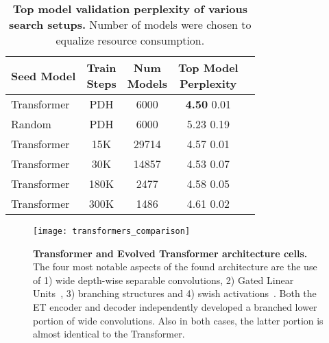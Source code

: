 \documentclass{article}
\begin{document}
\vskip -0.1in
\begin{table}[!h]
\begin{center}
\begin{small}
\begin{sc}
\begin{tabular}{lcccc}
\toprule
Seed Model & \thead{Train \\ Steps} & \thead{Num \\ Models} & \thead{Top Model \\ Perplexity} \\
\midrule
Transformer    & PDH & 6000 & \textbf{4.50}  0.01 \\
Random         & PDH & 6000 & 5.23  0.19 \\
Transformer    & 15K& 29714 & 4.57  0.01 \\
Transformer    & 30K& 14857 & 4.53  0.07 \\
Transformer    & 180K& 2477 & 4.58  0.05 \\
Transformer    & 300K& 1486 & 4.61  0.02 \\
\bottomrule
\end{tabular}
\end{sc}
\end{small}
\end{center}
\vskip -0.1in
\caption{\textbf{Top model validation perplexity of various search setups.} Number of models were chosen to equalize resource consumption.}
\vskip -0.1in
\label{table:hurdles_experiments}
\end{table}

\begin{figure}[th!]
\centerline{\texttt{[image: transformers\_comparison]}}
\vspace{-0.1in}
\caption{\textbf{Transformer and Evolved Transformer architecture cells.} The four most notable aspects of the found architecture are the use of 1) wide depth-wise separable convolutions, 2) Gated Linear Units~\cite{dauphin2017language}, 3) branching structures and 4) swish activations~\cite{ramachandran17}. Both the ET encoder and decoder independently developed a branched lower portion of wide convolutions. Also in both cases, the latter portion is almost identical to the Transformer.
}
\label{fig:architectures}
\vspace{-0.1in}
\end{figure}
\end{document}
